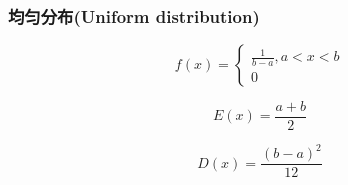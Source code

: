 \documentclass[11pt]{article}
\begin{document}
    \begin{center}
    \end{center}
    { \hspace*{\fill} \\}
    
    \hypertarget{ux5747ux5300ux5206ux5e03uniform-distribution}{%
\subsubsection{均匀分布(Uniform
distribution)}\label{ux5747ux5300ux5206ux5e03uniform-distribution}}

\begin{equation}
f(x)=\begin{cases}\frac{1}{b-a},a<x<b\\[1ex]0\end{cases}
\end{equation}

\begin{equation}
E(x)=\frac{a+b}{2}
\end{equation}

\begin{equation}
D(x)=\frac{(b-a)^2}{12}
\end{equation}
\end{document}
